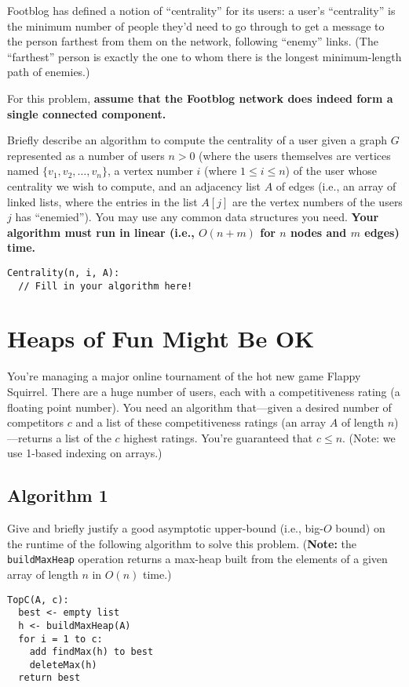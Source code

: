 \documentclass[11pt, oneside]{article}   	%
\theoremstyle{definition}
\theoremstyle{remark}
\begin{document}
Footblog has defined a notion of ``centrality'' for its users: a user's
``centrality'' is the minimum number of people they'd need to go through
to get a message to the person farthest from them on the network,
following ``enemy'' links. (The ``farthest'' person is exactly the one to
whom there is the longest minimum-length path of enemies.)

For this problem, \textbf{assume that the Footblog network does indeed form a single connected component.}

Briefly describe an algorithm to compute the centrality of a user
given a graph $G$ represented as a number of users $n > 0$ (where the
users themselves are vertices named $\{v_1, v_2, \ldots, v_n\}$, a
vertex number $i$ (where $1 \leq i \leq n$) of the user whose
centrality we wish to compute, and an adjacency list $A$ of edges
(i.e., an array of linked lists, where the entries in the list $A[j]$
are the vertex numbers of the users $j$ has ``enemied''). You may use
any common data structures you need. \textbf{Your algorithm must run in linear (i.e., $O(n + m)$ for $n$ nodes and $m$ edges) time.}


\begin{verbatim}
Centrality(n, i, A):
  // Fill in your algorithm here!
\end{verbatim}
\section{Heaps of Fun Might Be OK}

You're managing a major online tournament of the hot new game Flappy
Squirrel. There are a huge number of users, each with a
competitiveness rating (a floating point number). You need an
algorithm that---given a desired number of competitors $c$ and a list
of these competitiveness ratings (an array $A$ of length
$n$)---returns a list of the $c$ highest ratings. You're guaranteed
that $c \leq n$. (Note: we use 1-based indexing on arrays.)
\subsection{Algorithm 1}

Give and briefly justify a good asymptotic upper-bound (i.e., big-$O$
bound) on the runtime of the following algorithm to solve this
problem. (\textbf{Note:} the \texttt{buildMaxHeap} operation returns a max-heap
built from the elements of a given array of length $n$ in $O(n)$
time.)

\begin{verbatim}
TopC(A, c):
  best <- empty list
  h <- buildMaxHeap(A)
  for i = 1 to c:
    add findMax(h) to best
    deleteMax(h)
  return best
\end{verbatim}
\end{document}
